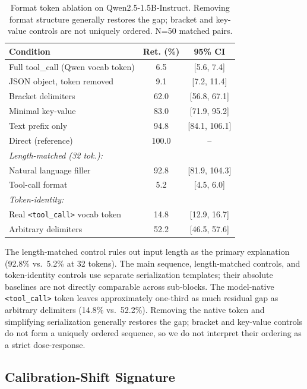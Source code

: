 \documentclass[conference]{IEEEtran}
\begin{document}
\begin{table}[t]
\caption{Format token ablation on Qwen2.5-1.5B-Instruct. Removing format structure generally restores the gap; bracket and key-value controls are not uniquely ordered. N=50 matched pairs.}
\label{tab:ablation}
\centering
\footnotesize
\begin{tabular}{lcc}
\toprule
Condition & Ret. (\%) & 95\% CI \\
\midrule
Full tool\_call (Qwen vocab token) & 6.5 & [5.6, 7.4] \\
JSON object, token removed & 9.1 & [7.2, 11.4] \\
Bracket delimiters & 62.0 & [56.8, 67.1] \\
Minimal key-value & 83.0 & [71.9, 95.2] \\
Text prefix only & 94.8 & [84.1, 106.1] \\
Direct (reference) & 100.0 & -- \\
\midrule
\multicolumn{3}{l}{\emph{Length-matched (32 tok.):}} \\
Natural language filler & 92.8 & [81.9, 104.3] \\
Tool-call format & 5.2 & [4.5, 6.0] \\
\midrule
\multicolumn{3}{l}{\emph{Token-identity:}} \\
Real \texttt{<tool\_call>} vocab token & 14.8 & [12.9, 16.7] \\
Arbitrary delimiters & 52.2 & [46.5, 57.6] \\
\bottomrule
\end{tabular}
\end{table}

The length-matched control rules out input length as the primary explanation (92.8\% vs.\ 5.2\% at 32 tokens). The main sequence, length-matched controls, and token-identity controls use separate serialization templates; their absolute baselines are not directly comparable across sub-blocks. The model-native \texttt{<tool\_call>} token leaves approximately one-third as much residual gap as arbitrary delimiters (14.8\% vs.\ 52.2\%). Removing the native token and simplifying serialization generally restores the gap; bracket and key-value controls do not form a uniquely ordered sequence, so we do not interpret their ordering as a strict dose-response.

\subsection{Calibration-Shift Signature}
\label{sec:calibration}
\end{document}
